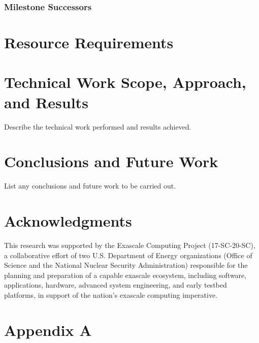 \documentclass{ecpreport}
\begin{document}
\subsubsection{Milestone Successors}
\section{Resource Requirements}

\section{Technical Work Scope, Approach, and Results}

Describe the technical work performed and results achieved. 

\section{Conclusions and Future Work}

List any conclusions and future work to be carried out.

\section*{Acknowledgments}

This research was supported by the Exascale Computing Project (17-SC-20-SC), a collaborative 
effort of two U.S. Department of Energy organizations (Office of Science and the National 
Nuclear Security Administration) responsible for the planning and preparation of a 
capable exascale ecosystem, including software, applications, hardware, advanced 
system engineering, and early testbed platforms, in support of the nation’s 
exascale computing imperative.





\newpage
\appendix
\section{Appendix A}
\end{document}
